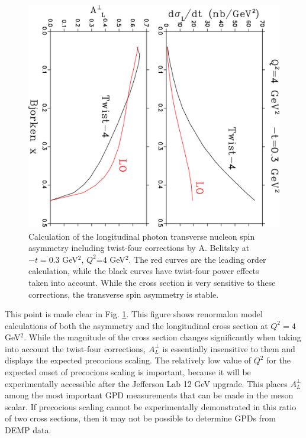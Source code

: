\begin{figure}[hbt!]
\begin{center}
\includegraphics[height=10cm, angle=90]{./figures/belitsky2.pdf}
\end{center}
\caption{\label{fig:belitsky_atpi}
\footnotesize{
Calculation of the longitudinal photon transverse nucleon spin asymmetry
including twist-four corrections by A. Belitsky \cite{belitsky} at $-t=0.3$
GeV$^2$, $Q^2$=4 GeV$^2$.  The red curves are the leading order calculation,
while the black curves have twist-four power effects taken into account.  While
the cross section is very sensitive to these corrections, the transverse spin
asymmetry is stable.}}
\end{figure}

This point is made clear in Fig. \ref{fig:belitsky_atpi}.  This figure shows
renormalon model calculations \cite{belitsky} of both the asymmetry and the
longitudinal cross section at $Q^2=4$ GeV$^2$.  While the magnitude of the
cross section changes significantly when taking into account the twist-four
corrections, $A_L^{\perp}$ is essentially insensitive to them and displays the
expected precocious scaling.  The relatively low value of $Q^2$ for the
expected onset of precocious scaling is important, because it will be
experimentally accessible after the Jefferson Lab 12 GeV upgrade.  This places
$A_L^{\perp}$ among the most important GPD measurements that can be made in the
meson scalar.  If precocious scaling cannot be experimentally demonstrated in
this ratio of two cross sections, then it may not be possible to determine
GPDs from DEMP data.

